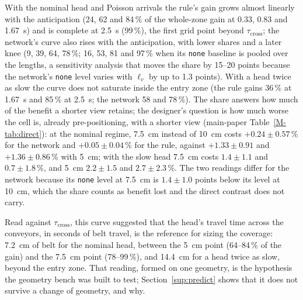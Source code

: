\documentclass[11pt,a4paper]{article}
\newcommand{\tcross}{\tau_{\mathrm{cross}}}
\newcommand{\lv}{\ell_{v}}
\begin{document}
\begin{table}[t]
\centering\small
\caption{Reference cell, nominal load: gain of pre-positioning at each visible length
(\texttt{when\_idle} vs \texttt{none}, same length; paired $\Delta$ of the penalized flow
time, \%, 95\,\% CI) and, in parentheses, its share of the gain with the whole entry zone
(10~cm). The second header row gives the anticipation in seconds at the belt speed of
3~cm/s. Seeds 7000--7029, shared with the companion paper.}
\label{tab:coverage}
\resizebox{\linewidth}{!}{}
\end{table}

With the nominal head and Poisson arrivals the rule's gain grows almost linearly with the
anticipation (24, 62 and 84\,\% of the whole-zone gain at 0.33, 0.83 and 1.67~s) and is
complete at 2.5~s (99\,\%), the first grid point beyond $\tcross$; the network's curve also
rises with the anticipation, with lower shares and a later knee (9, 39, 64, 78\,\%; 16, 53, 81 and 97\,\% when its
\texttt{none} baseline is pooled over the lengths, a sensitivity analysis that moves the
share by 15--20 points because the network's \texttt{none} level varies with $\lv$ by up
to 1.3 points). With a head twice as slow the curve does not saturate inside the entry
zone (the rule gains 36\,\% at 1.67~s and 85\,\% at 2.5~s; the network 58 and 78\,\%). The
share answers how much of the benefit a shorter view retains; the designer's question is
how much worse the cell is, already pre-positioning, with a shorter view
(main-paper Table~\ref{M-tab:direct}): at the nominal regime, 7.5~cm instead of 10~cm costs
$+0.24\pm0.57$\,\% for the network and $+0.05\pm0.04$\,\% for the rule, against
$+1.33\pm0.91$ and $+1.36\pm0.86$\,\% with 5~cm; with the slow head 7.5~cm costs
$1.4\pm1.1$ and $0.7\pm1.8$\,\%, and 5~cm $2.2\pm1.5$ and $2.7\pm2.3$\,\%. The two
readings differ for the network because its \texttt{none} level at 7.5~cm is $1.4\pm1.0$
points below its level at 10~cm, which the share counts as benefit lost and the direct
contrast does not carry.

Read against $\tcross$, this curve suggested that the head's travel time across the
conveyors, in seconds of belt travel, is the reference for sizing the coverage: 7.2~cm
of belt for the nominal head, between the 5~cm point (64--84\,\% of the gain) and the
7.5~cm point (78--99\,\%), and 14.4~cm for a head twice as slow, beyond the entry zone.
That reading, formed on one geometry, is the hypothesis the geometry bench was built to
test; Section~\ref{sup:predict} shows that it does not survive a change of geometry, and
why.
\end{document}
